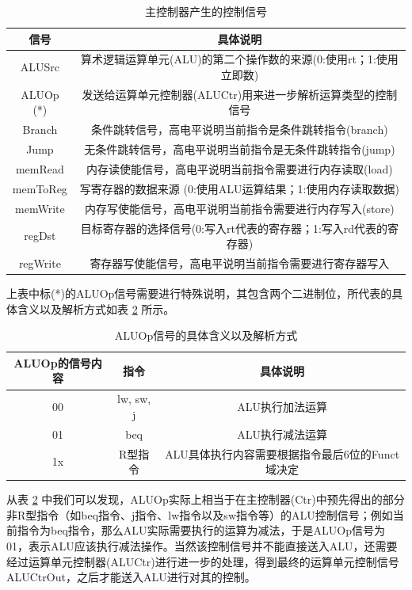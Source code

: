 \documentclass{cumcm}
\numberwithin{equation}{section}
\numberwithin{equation}{subsection}
\begin{document}
\begin{table}[htbp]
    \centering
    \begin{tabular}{|c|c|}
         \hline
         信号 & 具体说明 \\ \hline
         ALUSrc & 算术逻辑运算单元(ALU)的第二个操作数的来源(0:使用rt；1:使用立即数)\\
         ALUOp (*) & 发送给运算单元控制器(ALUCtr)用来进一步解析运算类型的控制信号 \\
         Branch & 条件跳转信号，高电平说明当前指令是条件跳转指令(branch) \\
         Jump & 无条件跳转信号，高电平说明当前指令是无条件跳转指令(jump) \\
         memRead & 内存读使能信号，高电平说明当前指令需要进行内存读取(load) \\
         memToReg & 写寄存器的数据来源 (0:使用ALU运算结果；1:使用内存读取数据) \\
         memWrite & 内存写使能信号，高电平说明当前指令需要进行内存写入(store) \\
         regDst & 目标寄存器的选择信号(0:写入rt代表的寄存器；1:写入rd代表的寄存器)\\
         regWrite & 寄存器写使能信号，高电平说明当前指令需要进行寄存器写入 \\
         \hline
    \end{tabular}
    \caption{主控制器产生的控制信号}
    \label{tab1}
\end{table}

上表中标(*)的ALUOp信号需要进行特殊说明，其包含两个二进制位，所代表的具体含义以及解析方式如表 \ref{tab2} 所示。

\begin{table}[htbp]
    \centering
    \begin{tabular}{|c|c|c|}
         \hline
         ALUOp的信号内容 & 指令 & 具体说明 \\
         \hline
         00 & lw, sw, j & ALU执行加法运算 \\
         01 & beq & ALU执行减法运算 \\
         1x & R型指令 & ALU具体执行内容需要根据指令最后6位的Funct域决定 \\
         \hline
    \end{tabular}
    \caption{ALUOp信号的具体含义以及解析方式}
    \label{tab2}
\end{table}

从表 \ref{tab2} 中我们可以发现，ALUOp实际上相当于在主控制器(Ctr)中预先得出的部分非R型指令（如beq指令、j指令、lw指令以及sw指令等）的ALU控制信号；例如当前指令为beq指令，那么ALU实际需要执行的运算为减法，于是ALUOp信号为01，表示ALU应该执行减法操作。当然该控制信号并不能直接送入ALU，还需要经过运算单元控制器(ALUCtr)进行进一步的处理，得到最终的运算单元控制信号ALUCtrOut，之后才能送入ALU进行对其的控制。
\end{document}
